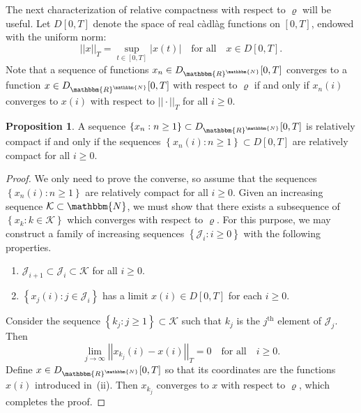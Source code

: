 \documentclass[a4paper, 12pt]{article}
\theoremstyle{definition}
\newtheorem{proposition}[theorem]{Proposition}
\newcommand{\norm}[1]{\left|\left|#1\right|\right|}
\newcommand{\set}[2]{\left\{#1 : #2\right\}}
\newcommand{\calJ}{\mathcal{J}}
\newcommand{\calK}{\mathcal{K}}
\newcommand{\scdot}{{}\cdot{}}
\newcommand{\N}{\mathbbm{N}}
\newcommand{\R}{\mathbbm{R}}
\begin{document}
\begin{appendices}
	The next characterization of relative compactness with respect to $\varrho$ will be useful. Let $D[0, T]$ denote the space of real c\`adl\`ag functions on $[0, T]$, endowed with the uniform norm:
	\begin{equation*}
		\norm{x}_T = \sup_{t \in [0, T]} |x(t)| \quad \text{for all} \quad x \in D[0, T].
	\end{equation*}
	Note that a sequence of functions $x_n \in D_{\R^\N}[0, T]$ converges to a function $x \in D_{\R^\N}[0, T]$ with respect to $\varrho$ if and only if $x_n(i)$ converges to $x(i)$ with respect to $\norm{\scdot}_T$ for all $i \geq 0$.
	
	\begin{proposition}
		\label{prop: relative compactness from coordinates}
		A sequence $\set{x_n}{n \geq 1} \subset D_{\R^\N}[0, T]$ is relatively compact if and only if the sequences $\set{x_n(i)}{n \geq 1} \subset D[0, T]$ are relatively compact for all $i \geq 0$.
	\end{proposition}
	
	\begin{proof}
	We only need to prove the converse, so assume that the sequences $\set{x_n(i)}{n \geq 1}$ are relatively compact for all $i \geq 0$. Given an increasing sequence $\calK \subset \N$, we must show that there exists a subsequence of $\set{x_k}{k \in \calK}$ which converges with respect to $\varrho$. For this purpose, we may construct a family of increasing sequences $\set{\calJ_i}{i \geq 0}$ with the following properties.
	\begin{enumerate}
		\item[(i)] $\calJ_{i + 1} \subset \calJ_i \subset \calK$ for all $i \geq 0$.
		
		\item[(ii)] $\set{x_j(i)}{j \in \calJ_i}$ has a limit $x(i) \in D[0, T]$ for each $i \geq 0$.
	\end{enumerate}
	
	Consider the sequence $\set{k_j}{j \geq 1} \subset \calK$ such that $k_j$ is the $j^{\text{th}}$ element of $\calJ_j$. Then
	\begin{equation*}
		\lim_{j \to \infty} \norm{x_{k_j}(i) - x(i)}_T = 0 \quad \text{for all} \quad i \geq 0.
	\end{equation*} 
	Define $x \in D_{\R^\N}[0, T]$ so that its coordinates are the functions $x(i)$ introduced in~(ii). Then $x_{k_j}$ converges to $x$ with respect to $\varrho$, which completes the proof.
	\end{proof}
	

\end{appendices}
\end{document}
